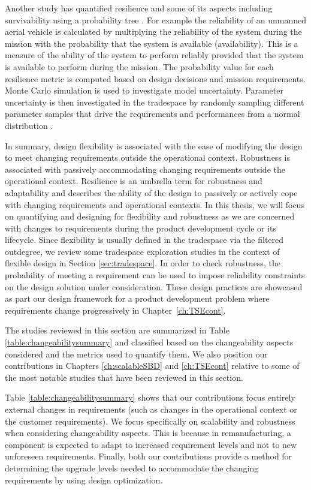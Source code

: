 Another study has quantified resilience and some of its aspects including survivability using a probability tree \cite{Small2019}. For example the reliability of an unmanned aerial vehicle is calculated by multiplying the reliability of the system during the mission with the probability that the system is available (availability). This is a measure of the ability of the system to perform reliably provided that the system is available to perform during the mission. The probability value for each resilience metric is computed based on design decisions and mission requirements. Monte Carlo simulation is used to investigate model uncertainty. Parameter uncertainty is then investigated in the tradespace by randomly sampling different parameter samples that drive the requirements and performances from a normal distribution \cite{Small2019}. 

In summary, design flexibility is associated with the ease of modifying the design to meet changing requirements outside the operational context. Robustness is associated with passively accommodating changing requirements outside the operational context. Resilience is an umbrella term for robustness and adaptability and describes the ability of the design to passively or actively cope with changing requirements and operational contexts. In this thesis, we will focus on quantifying and designing for flexibility and robustness as we are concerned with changes to requirements during the product development cycle or its lifecycle. Since flexibility is usually defined in the tradespace via the filtered outdegree, we review some tradespace exploration studies in the context of flexible design in Section \ref{sec:tradespace}. In order to check robustness, the probability of meeting a requirement can be used to impose reliability constraints on the design solution under consideration. These design practices are showcased as part our design framework for a product development problem where requirements change progressively in Chapter~\ref{ch:TSEcont}.

The studies reviewed in this section are summarized in Table \ref{table:changeabilitysummary} and classified based on the changeability aspects considered and the metrics used to quantify them. We also position our contributions in Chapters \ref{ch:scalableSBD} and \ref{ch:TSEcont} relative to some of the most notable studies that have been reviewed in this section.

Table \ref{table:changeabilitysummary} shows that our contributions focus entirely external changes in requirements (such as changes in the operational context or the customer requirements). We focus specifically on scalability and robustness when considering changeability aspects. This is because in remanufacturing, a component is expected to adapt to increased requirement levels and not to new unforeseen requirements. Finally, both our contributions provide a method for determining the upgrade levels needed to accommodate the changing requirements by using design optimization.


